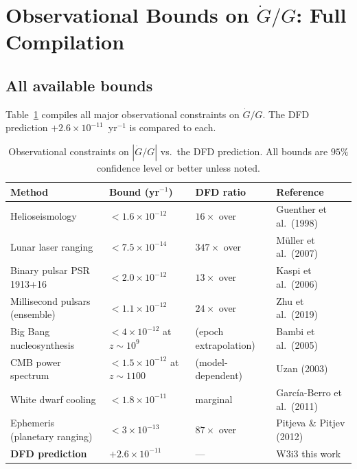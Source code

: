 \documentclass[11pt]{article}
\newcommand{\ee}[1]{\times 10^{#1}}
\begin{document}
\section{Observational Bounds on $\dot{G}/G$: Full Compilation}
\label{sec:bounds}

\subsection{All available bounds}

Table~\ref{tab:Gdot-bounds} compiles all major observational constraints on
$\dot{G}/G$. The DFD prediction $+2.6\ee{-11}$~yr$^{-1}$ is compared to each.

\begin{table}[h]
\centering
\caption{Observational constraints on $|\dot{G}/G|$ vs.\ the DFD prediction.
All bounds are $95\%$ confidence level or better unless noted.}
\label{tab:Gdot-bounds}
\begin{tabular}{llll}
\toprule
\textbf{Method} & \textbf{Bound (yr$^{-1}$)} & \textbf{DFD ratio} & \textbf{Reference} \\
\midrule
Helioseismology & $< 1.6\ee{-12}$ & $16\times$ over & Guenther et al.\ (1998) \\
Lunar laser ranging & $< 7.5\ee{-14}$ & $347\times$ over & M\"{u}ller et al.\ (2007) \\
Binary pulsar PSR 1913+16 & $< 2.0\ee{-12}$ & $13\times$ over & Kaspi et al.\ (2006) \\
Millisecond pulsars (ensemble) & $< 1.1\ee{-12}$ & $24\times$ over & Zhu et al.\ (2019) \\
Big Bang nucleosynthesis & $< 4\ee{-12}$ at $z\sim10^9$ & (epoch extrapolation) & Bambi et al.\ (2005) \\
CMB power spectrum & $< 1.5\ee{-12}$ at $z\sim1100$ & (model-dependent) & Uzan (2003) \\
White dwarf cooling & $< 1.8\ee{-11}$ & marginal & Garc\'{i}a-Berro et al.\ (2011) \\
Ephemeris (planetary ranging) & $< 3\ee{-13}$ & $87\times$ over & Pitjeva \& Pitjev (2012) \\
\midrule
\textbf{DFD prediction} & $+2.6\ee{-11}$ & --- & W3i3 this work \\
\bottomrule
\end{tabular}
\end{table}
\end{document}
